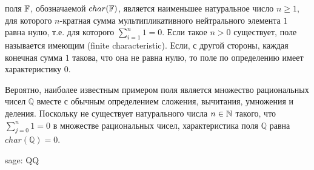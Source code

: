 \label{def:characteristic} поля $ \mathbb{F} $, обозначаемой $char(\mathbb{F})$, является наименьшее натуральное число $ n \geq 1 $, для которого $n$-кратная сумма мультипликативного нейтрального элемента $ 1 $ равна нулю, т.е. для которого $ \sum_{i = 1} ^ n 1 = 0 $. Если такое $ n> 0 $ существует, поле называется имеющим  (finite characteristic). Если, с другой стороны, каждая конечная сумма $1$ такова, что она не равна нулю, то поле по определению имеет характеристику $ 0 $. 
\begin{example} Вероятно, наиболее известным примером поля является множество рациональных чисел $\mathbb{Q}$ вместе с обычным определением сложения, вычитания, умножения и деления. Поскольку не существует натурального числа $n\in \mathbb{N}$ такого, что $\sum_{j=0}^n 1 =0$ в множестве рациональных чисел, характеристика поля $\mathbb{Q}$ равна $char(\mathbb{Q})=0$.
\begin{sagecommandline}
sage: QQ
\end{sagecommandline}
\end{example}
